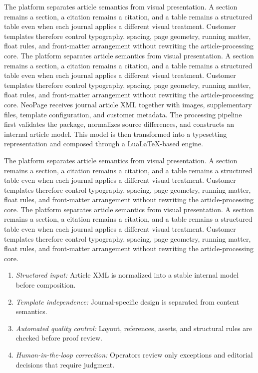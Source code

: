 \documentclass{tnqjournal}
\begin{document}
The platform separates article semantics from visual presentation. A section remains a section, a citation remains a citation, and a table remains a structured table even when each journal applies a different visual treatment. Customer templates therefore control typography, spacing, page geometry, running matter, float rules, and front-matter arrangement without rewriting the article-processing core. The platform separates article semantics from visual presentation. A section remains a section, a citation remains a citation, and a table remains a structured table even when each journal applies a different visual treatment. Customer templates therefore control typography, spacing, page geometry, running matter, float rules, and front-matter arrangement without rewriting the article-processing core. NeoPage receives journal article XML together with images, supplementary files, template configuration, and customer metadata. The processing pipeline first validates the package, normalizes source differences, and constructs an internal article model. This model is then transformed into a typesetting representation and composed through a LuaLaTeX-based engine.

The platform separates article semantics from visual presentation. A section remains a section, a citation remains a citation, and a table remains a structured table even when each journal applies a different visual treatment. Customer templates therefore control typography, spacing, page geometry, running matter, float rules, and front-matter arrangement without rewriting the article-processing core. The platform separates article semantics from visual presentation. A section remains a section, a citation remains a citation, and a table remains a structured table even when each journal applies a different visual treatment. Customer templates therefore control typography, spacing, page geometry, running matter, float rules, and front-matter arrangement without rewriting the article-processing core.

\begin{enumerate}
\item \textit{Structured input:} Article XML is normalized into a stable internal model before composition.
\item \textit{Template independence:} Journal-specific design is separated from content semantics.
\item \textit{Automated quality control:} Layout, references, assets, and structural rules are checked before proof review.
\item \textit{Human-in-the-loop correction:} Operators review only exceptions and editorial decisions that require judgment.
\end{enumerate}
\end{document}
